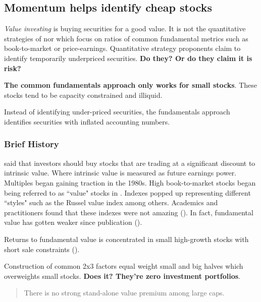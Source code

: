 
\subsection{Momentum helps identify cheap stocks \textcite{kok2017facts}}

\emph{Value investing} is buying securities  for a good value.
It is not the quantitative strategies of \textcite{lakonishok1994contrarian} 
nor 
\textcite{chan2004value} which focus on ratios of common fundamental metrics 
such 
as book-to-market or price-earnings.
Quantitative strategy proponents claim to identify temporarily underpriced 
securities. \textbf{Do they? Or do they claim it is risk?}

\textbf{The common fundamentals approach only works for small stocks}.
These stocks tend to be capacity constrained and illiquid.

Instead of identifying under-priced securities, the fundamentals approach 
identifies securities with inflated accounting numbers.

\subsubsection{Brief History}

\textcite{graham1934security} said that investors should buy stocks that are 
trading at a significant discount to intrinsic value.
Where intrinsic value is measured as future earnings power.
Multiples began gaining traction in the 1980s.
High book-to-market stocks began being referred to as ``value" stocks in 
\textcite{fama1992cross}.
Indexes popped up representing different ``styles" such as the Russel value 
index among others.
Academics and practitioners found that these indexes were not amazing 
(\parencite{loughran1997book}).
In fact, fundamental value has gotten weaker since publication 
(\parencite{mclean2016does}).

Returns to fundamental value is concentrated in small high-growth stocks with 
short sale constraints (\parencite{nagel2005short}).

Construction of common 2x3 factors equal weight small and big halves which 
overweights small stocks. \textbf{Does it? They're zero investment portfolios}.

\textcite{asness2015fact}
\begin{quotation}
  There is no strong stand-alone value premium among large caps.
\end{quotation}

